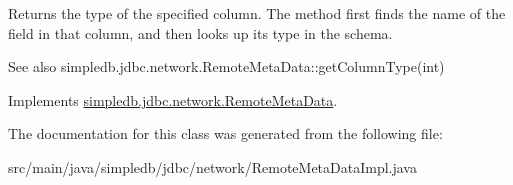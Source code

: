 Returns the type of the specified column. The method first finds the name of the field in that column, and then looks up its type in the schema. \begin{DoxySeeAlso}{See also}
simpledb.\+jdbc.\+network.\+Remote\+Meta\+Data\+::get\+Column\+Type(int) 
\end{DoxySeeAlso}


Implements \hyperlink{interfacesimpledb_1_1jdbc_1_1network_1_1RemoteMetaData}{simpledb.\+jdbc.\+network.\+Remote\+Meta\+Data}.



The documentation for this class was generated from the following file\+:\begin{DoxyCompactItemize}
\item 
src/main/java/simpledb/jdbc/network/Remote\+Meta\+Data\+Impl.\+java\end{DoxyCompactItemize}
